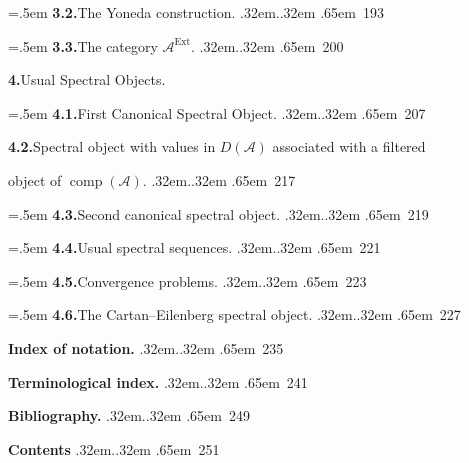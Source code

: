 \clearpage
{}%
\begingroup
\small
\setlength{\parindent}{0pt}%
\setlength{\parskip}{0pt}%
\setlength{\emergencystretch}{3em}%
\newcommand{\VerdierContentsRow}[3]{%
  \par\noindent
  \hangindent=#1\relax\hangafter=1
  \hspace*{#1}#2\nobreak
  \leaders\hbox{\kern.32em.\kern.32em}\hfill
  \nobreak\hbox{\kern.65em #3}\par}
\newcommand{\VerdierContentsWrappedRow}[3]{%
  \par\noindent\hspace*{.5em}#1\par\nobreak
  \noindent\hspace*{3.15em}#2\nobreak
  \leaders\hbox{\kern.32em.\kern.32em}\hfill
  \nobreak\hbox{\kern.65em #3}\par}
\newcommand{\VerdierContentsSection}[2]{%
  \par\addvspace{.55\baselineskip}\noindent
  \hfill\textbf{#1.}\enspace #2\hfill\mbox{}\par\smallskip}

%
\VerdierContentsRow{.5em}{\textbf{3.2.}\enspace The Yoneda construction.}{193}
%
\VerdierContentsRow{.5em}{\textbf{3.3.}\enspace The category $\mathcal A^{\operatorname{Ext}}$.}{200}

%
\VerdierContentsSection{4}{Usual Spectral Objects.}
%
\VerdierContentsRow{.5em}{\textbf{4.1.}\enspace First Canonical Spectral Object.}{207}
%
\VerdierContentsWrappedRow{\textbf{4.2.}\enspace Spectral object with values in $D(\mathcal A)$ associated with a filtered}{object of $\operatorname{comp}(\mathcal A)$.}{217}
%
\VerdierContentsRow{.5em}{\textbf{4.3.}\enspace Second canonical spectral object.}{219}
%
\VerdierContentsRow{.5em}{\textbf{4.4.}\enspace Usual spectral sequences.}{221}
%
\VerdierContentsRow{.5em}{\textbf{4.5.}\enspace Convergence problems.}{223}
%
\VerdierContentsRow{.5em}{\textbf{4.6.}\enspace The Cartan--Eilenberg spectral object.}{227}

\vspace{1.2\baselineskip}
%
\VerdierContentsRow{0pt}{\textbf{Index of notation.}}{235}
\vspace{.8\baselineskip}
%
\VerdierContentsRow{0pt}{\textbf{Terminological index.}}{241}
\vspace{.8\baselineskip}
%
\VerdierContentsRow{0pt}{\textbf{Bibliography.}}{249}
\vspace{.8\baselineskip}
%
\VerdierContentsRow{0pt}{\textbf{Contents}}{251}
\endgroup
